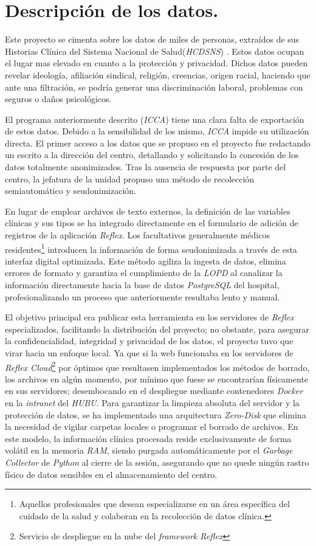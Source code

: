 \section{Descripción de los datos.}
Este proyecto se cimenta sobre los datos de miles de personas, extraídos de sus Historias Clínica del Sistema Nacional de Salud(\textit{HCDSNS}) \cite{hcdsns}. Estos datos ocupan el lugar mas elevado en cuanto a la protección y privacidad. Dichos datos pueden revelar ideología, afiliación sindical, religión, creencias, origen racial, haciendo que ante una filtración, se podría generar una discriminación laboral, problemas con seguros o daños psicológicos.

El programa anteriormente descrito (\textit{ICCA}) tiene una clara falta de exportación de estos datos. Debido a la sensibilidad de los mismo, \textit{ICCA} impide su utilización directa. El primer acceso a los datos que se propuso en el proyecto fue redactando un escrito a la dirección del centro, detallando y solicitando la concesión de los datos totalmente anonimizados. Tras la ausencia de respuesta por parte del centro, la jefatura de la unidad propuso una método de recolección semiautomático y seudonimización.

En lugar de emplear archivos de texto externos, la definición de las variables clínicas y sus tipos se ha integrado directamente en el formulario de adición de registros de la aplicación \textit{Reflex}. Los facultativos generalmente médicos residentes\footnote{Aquellos profesionales que desean especializarse en un área específica del cuidado de la salud y colaboran en la recolección de datos clínica.} introducen la información de forma seudonimizada a través de esta interfaz digital optimizada. Este método agiliza la ingesta de datos, elimina errores de formato y garantiza el cumplimiento de la \textit{LOPD} al canalizar la información directamente hacia la base de datos \textit{PostgreSQL} del hospital, profesionalizando un proceso que anteriormente resultaba lento y manual.

El objetivo principal era publicar esta herramienta en los servidores de \textit{Reflex} especializados, facilitando la distribución del proyecto; no obstante, para asegurar la confidencialidad, integridad y privacidad de los datos, el proyecto tuvo que virar hacia un enfoque local. Ya que si la web funcionaba en los servidores de \textit{Reflex Cloud}\footnote{Servicio de despliegue en la nube del \textit{framework Reflex}} por óptimos que resultasen implementados los métodos de borrado, los archivos en algún momento, por mínimo que fuese se encontrarían físicamente en sus servidores; desembocando en el despliegue mediante contenedores \textit{Docker} en la \textit{intranet} del \textit{HUBU}. Para garantizar la limpieza absoluta del servidor y la protección de datos, se ha implementado una arquitectura \textit{Zero-Disk} que elimina la necesidad de vigilar carpetas locales o programar el borrado de archivos. En este modelo, la información clínica procesada reside exclusivamente de forma volátil en la memoria \textit{RAM}, siendo purgada automáticamente por el \textit{Garbage Collector} de \textit{Python} al cierre de la sesión, asegurando que no quede ningún rastro físico de datos sensibles en el almacenamiento del centro.

